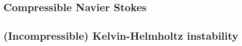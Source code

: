 \documentclass[review]{siamart}
\begin{document}


\subsection{Compressible Navier Stokes}\label{sec:numerics:ns}




\subsection{(Incompressible) Kelvin-Helmholtz instability}\label{sec:numerics:khi}
\end{document}
